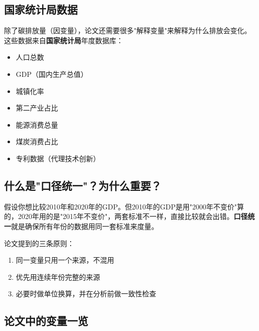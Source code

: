 \documentclass[12pt, a4paper]{article}
\begin{document}
\subsection{国家统计局数据}

除了碳排放量（因变量），论文还需要很多"解释变量"来解释为什么排放会变化。这些数据来自\textbf{国家统计局}年度数据库：
\begin{itemize}[leftmargin=2em]
\item 人口总数
\item GDP（国内生产总值）
\item 城镇化率
\item 第二产业占比
\item 能源消费总量
\item 煤炭消费占比
\item 专利数据（代理技术创新）
\end{itemize}

\subsection{什么是"口径统一"？为什么重要？}

\begin{warningbox}
假设你想比较2010年和2020年的GDP。但2010年的GDP是用"2000年不变价"算的，2020年用的是"2015年不变价"，两套标准不一样，直接比较就会出错。\textbf{口径统一}就是确保所有年份的数据用同一套标准来度量。
\end{warningbox}

论文提到的三条原则：
\begin{enumerate}[leftmargin=2em]
\item 同一变量只用一个来源，不混用
\item 优先用连续年份完整的来源
\item 必要时做单位换算，并在分析前做一致性检查
\end{enumerate}

\subsection{论文中的变量一览}
\end{document}
